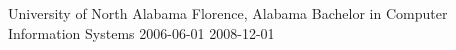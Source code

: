 \educationitem
    {University of North Alabama}
    {Florence, Alabama}
    {Bachelor in Computer Information Systems}
    {2006-06-01}
    {2008-12-01}